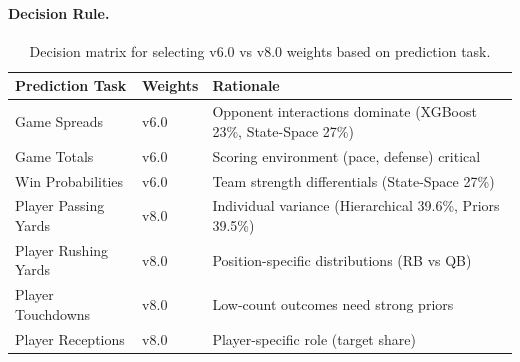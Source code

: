 \paragraph{Decision Rule.}
\begin{table}[htbp]
\centering
\caption[Dual-weight decision matrix]{Decision matrix for selecting v6.0 vs v8.0 weights based on prediction task.}
\label{tab:dual-weight-decision}
\small
\setlength{\tabcolsep}{4pt}
\begin{tabularx}{\textwidth}{@{}llX@{}}
\toprule
\textbf{Prediction Task} & \textbf{Weights} & \textbf{Rationale} \\
\midrule
Game Spreads & v6.0 & Opponent interactions dominate (XGBoost 23\%, State-Space 27\%) \\
Game Totals & v6.0 & Scoring environment (pace, defense) critical \\
Win Probabilities & v6.0 & Team strength differentials (State-Space 27\%) \\
\midrule
Player Passing Yards & v8.0 & Individual variance (Hierarchical 39.6\%, Priors 39.5\%) \\
Player Rushing Yards & v8.0 & Position-specific distributions (RB vs QB) \\
Player Touchdowns & v8.0 & Low-count outcomes need strong priors \\
Player Receptions & v8.0 & Player-specific role (target share) \\
\bottomrule
\end{tabularx}
\end{table}

